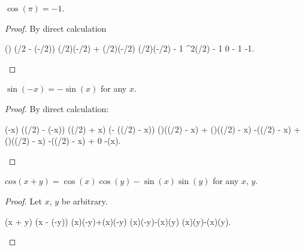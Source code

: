 \begin{proposition}\label{prop:cos-pi-is-minus-one}
$\cos(\pi)=-1$.
\end{proposition}
\begin{proof}
  By direct calculation
\begin{calculation}
\cos(\pi)
\cos\bigl(\pi/2 - (-\pi/2)\bigr)
\cos(\pi/2)\cos(-\pi/2) + \sin(\pi/2)\sin(-\pi/2)
\cos(\pi/2)\cos(-\pi/2) - 1
\cos^{2}(\pi/2) - 1
0 - 1
-1.\qedhere
\end{calculation}
\end{proof}

\begin{proposition}\label{prop:sine-is-odd-function}
$\sin(-x) = -\sin(x)$ for any $x$.
\end{proposition}
\begin{proof}
By direct calculation:
  \begin{calculation}
  \sin(-x)
  \cos\bigl((\pi/2) - (-x)\bigr)
  \cos\bigl((\pi/2) + x\bigr)
  \cos\bigl(\pi - ((\pi/2) - x)\bigr)
  \cos(\pi)\cos\bigl((\pi/2) - x\bigr) + \sin(\pi)\sin\bigl((\pi/2) - x\bigr) 
  -\cos\bigl((\pi/2) - x\bigr) + \sin(\pi)\sin\bigl((\pi/2) - x\bigr) 
-\cos\bigl((\pi/2) - x\bigr) + 0
-\sin(x).\qedhere
\end{calculation}
\end{proof}

\begin{proposition}\label{prop:trigonometry:cos-addition-law}
$cos(x+y) = \cos(x)\cos(y) - \sin(x)\sin(y)$ for any $x$, $y$.
\end{proposition}
\begin{proof}
Let $x$, $y$ be arbitrary.
\begin{calculation}
  \cos(x + y)
\cos(x - (-y))
\cos(x)\cos(-y)+\sin(x)\sin(-y)
\cos(x)\cos(-y)-\sin(x)\sin(y)
\cos(x)\cos(y)-\sin(x)\sin(y).\qedhere
\end{calculation}
\end{proof}

